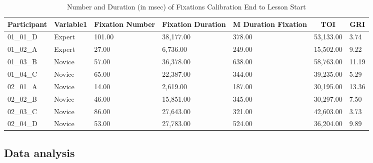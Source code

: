 \documentclass[
  english,
  man,floatsintext]{apa6}
\begin{document}
\begin{table}[h]

\begin{center}
\begin{threeparttable}

\caption{\label{tab:Calib end to lession start TOI}Number and Duration (in msec) of Fixations Calibration End to Lesson Start}

\scriptsize{

\begin{tabular}{lllllll}
\toprule
Participant & \multicolumn{1}{c}{Variable1} & \multicolumn{1}{c}{Fixation Number} & \multicolumn{1}{c}{Fixation Duration} & \multicolumn{1}{c}{M Duration Fixation} & \multicolumn{1}{c}{TOI} & \multicolumn{1}{c}{GRI}\\
\midrule
01\_01\_D & Expert & 101.00 & 38,177.00 & 378.00 & 53,133.00 & 3.74\\
01\_02\_A & Expert & 27.00 & 6,736.00 & 249.00 & 15,502.00 & 9.22\\
01\_03\_B & Novice & 57.00 & 36,378.00 & 638.00 & 58,763.00 & 11.19\\
01\_04\_C & Novice & 65.00 & 22,387.00 & 344.00 & 39,235.00 & 5.29\\
02\_01\_A & Novice & 14.00 & 2,619.00 & 187.00 & 30,195.00 & 13.36\\
02\_02\_B & Novice & 46.00 & 15,851.00 & 345.00 & 30,297.00 & 7.50\\
02\_03\_C & Novice & 86.00 & 27,643.00 & 321.00 & 42,603.00 & 3.73\\
02\_04\_D & Novice & 53.00 & 27,783.00 & 524.00 & 36,204.00 & 9.89\\
\bottomrule
\end{tabular}

}

\end{threeparttable}
\end{center}

\end{table}

\hypertarget{data-analysis}{%
\subsection{Data analysis}\label{data-analysis}}
\end{document}
